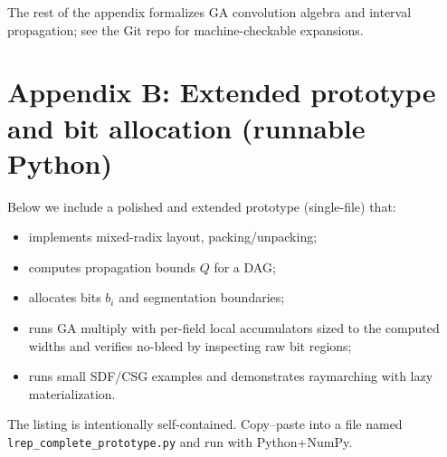 \documentclass[11pt]{article}
\theoremstyle{definition}
\theoremstyle{plain}
\begin{document}
The rest of the appendix formalizes GA convolution algebra and interval propagation; see the Git repo for machine-checkable expansions.

\section{Appendix B: Extended prototype and bit allocation (runnable Python)}
Below we include a polished and extended prototype (single-file) that:
\begin{itemize}
  \item implements mixed-radix layout, packing/unpacking;
  \item computes propagation bounds \(Q\) for a DAG;
  \item allocates bits \(b_i\) and segmentation boundaries;
  \item runs GA multiply with per-field local accumulators sized to the computed widths and verifies no-bleed by inspecting raw bit regions;
  \item runs small SDF/CSG examples and demonstrates raymarching with lazy materialization.
\end{itemize}

The listing is intentionally self-contained. Copy–paste into a file named \verb|lrep_complete_prototype.py| and run with Python+NumPy.
\end{document}
